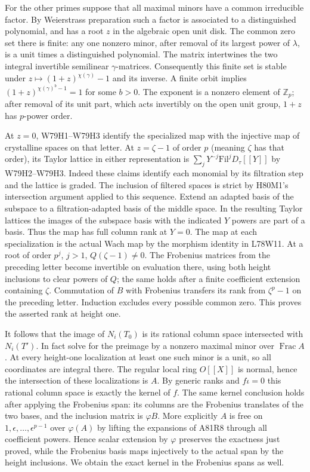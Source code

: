 For the other primes suppose that all maximal minors have a common
irreducible factor. By Weierstrass preparation such a factor is
associated to a distinguished polynomial, and has a root $z$ in the
algebraic open unit disk. The common zero set there is finite:
any one nonzero minor, after removal of its largest power of
$\lambda$, is a unit times a distinguished polynomial.
The matrix intertwines the two integral invertible semilinear
$\gamma$-matrices. Consequently this finite set is stable under
$z\mapsto(1+z)^{\chi(\gamma)}-1$ and its inverse. A finite
orbit implies $(1+z)^{\chi(\gamma)^b-1}=1$ for some $b>0$.
The exponent is a nonzero element of $\mathbb Z_p$; after removal
of its unit part, which acts invertibly on the open unit group,
$1+z$ has $p$-power order.

At $z=0$, W79H1--W79H3 identify the specialized map with the
injective map of crystalline spaces on that letter. At
$z=\zeta-1$ of order $p$ (meaning $\zeta$ has that order), its
Taylor lattice in either representation is
$\sum_j Y^{-j}\mathrm{Fil}^jD_{\tau}[[Y]]$ by W79H2--W79H3.
Indeed these claims identify each monomial by its filtration step
and the lattice is graded. The inclusion of filtered spaces is
strict by H80M1's intersection argument applied to this sequence.
Extend an adapted basis of the subspace to a filtration-adapted
basis of the middle space. In the resulting Taylor lattices the
images of the subspace basis with the indicated $Y$ powers are
part of a basis. Thus the map has full column rank at $Y=0$.
The map at each specialization is the actual Wach map by the
morphism identity in L78W11. At a root of order $p^j$, $j>1$,
$Q(\zeta-1)\ne0$. The Frobenius matrices from the preceding
letter become invertible on evaluation there, using both height
inclusions to clear powers of $Q$; the same holds after a finite
coefficient extension containing $\zeta$. Commutation of $B$
with Frobenius transfers its rank from $\zeta^p-1$ on the
preceding letter. Induction excludes every possible common zero.
This proves the asserted rank at height one.

It follows that the image of $N_i(T_0)$ is its rational column
space intersected with $N_i(T')$. In fact solve for the preimage
by a nonzero maximal minor over $\operatorname{Frac} A$. At every
height-one localization at least one such minor is a unit, so all
coordinates are integral there. The regular local ring $O[[X]]$
is normal, hence the intersection of these localizations is $A$.
By generic ranks and $f\iota=0$ this rational column space is exactly
the kernel of $f$. The same kernel conclusion holds after applying
the Frobenius span: its columns are the Frobenius translates of
the two bases, and the inclusion matrix is $\varphi B$.
More explicitly $A$ is free on $1,\epsilon,\ldots,\epsilon^{p-1}$
over $\varphi(A)$ by lifting the expansions of A81R8 through all
coefficient powers. Hence scalar extension by $\varphi$ preserves
the exactness just proved, while the Frobenius basis maps injectively
to the actual span by the height inclusions. We obtain the exact
kernel in the Frobenius spans as well.

